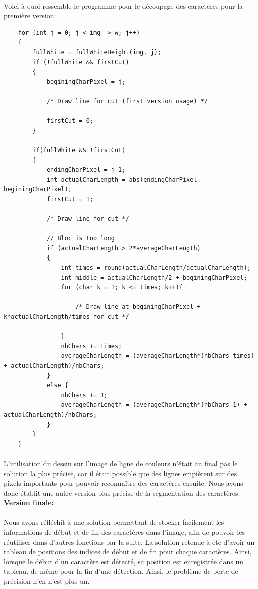\documentclass{article}
\begin{document}
	\paragraph{}
	Voici à quoi ressemble le programme pour le découpage des caractères pour la première version:
	\begin{lstlisting}
	for (int j = 0; j < img -> w; j++)
    {
        fullWhite = fullWhiteHeight(img, j);
        if (!fullWhite && firstCut)
        {
            beginingCharPixel = j;

            /* Draw line for cut (first version usage) */

            firstCut = 0;
        }
        
        if(fullWhite && !firstCut) 
        {
            endingCharPixel = j-1;
            int actualCharLength = abs(endingCharPixel - beginingCharPixel);
            firstCut = 1;
            
            /* Draw line for cut */

            // Bloc is too long
            if (actualCharLength > 2*averageCharLength)
            {
                int times = round(actualCharLength/actualCharLength);
                int middle = actualCharLength/2 + beginingCharPixel;
                for (char k = 1; k <= times; k++){
                    
                    /* Draw line at beginingCharPixel + k*actualCharLength/times for cut */

                }
                nbChars += times;
                averageCharLength = (averageCharLength*(nbChars-times) + actualCharLength)/nbChars;
            }
            else {
                nbChars += 1;
                averageCharLength = (averageCharLength*(nbChars-1) + actualCharLength)/nbChars;
            }
        }
    }
	\end{lstlisting}
	
	\paragraph{}
    L'utilisation du dessin sur l'image de ligne de couleurs n'était au final pas le solution la plus précise, car il était possible que des lignes empiètent sur des pixels importants pour pouvoir reconnaître des caractères ensuite. Nous avons donc établit une autre version plus précise de la segmentation des caractères.\\
    
    
    \textbf{Version finale:}
    \paragraph{}
    Nous avons réfléchit à une solution permettant de stocker facilement les informations de début et de fin des caractères dans l'image, afin de pouvoir les réutiliser dans d'autres fonctions par la suite. La solution retenue à été d'avoir un tableau de positions des indices de début et de fin pour chaque caractères. Ainsi, lorsque le début d'un caractère est détecté, sa position est enregistrée dans un tableau, de même pour la fin d'une détection. Ainsi, le problème de perte de précision n'en n'est plus un.
	
\end{document}
